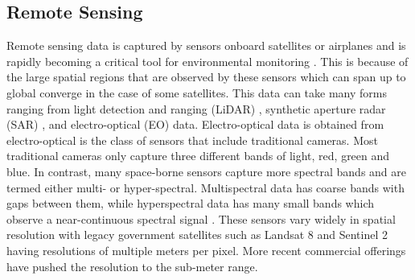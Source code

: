 \subsection{Remote Sensing}
Remote sensing data is captured by sensors onboard satellites or airplanes and is rapidly becoming a critical tool for environmental monitoring \cite{Parra2022RemoteMonitoring}. This is because of the large spatial regions that are observed by these sensors which can span up to global converge in the case of some satellites. This data can take many forms ranging from light detection and ranging (LiDAR) \cite{LiDARForestryBeland2019}, synthetic aperture radar (SAR) \cite{Hall2020WhatEarthdata}, and electro-optical (EO) data. Electro-optical data is obtained from electro-optical is the class of sensors that include traditional cameras. Most traditional cameras only capture three different bands of light, red, green and blue. In contrast, many space-borne sensors capture more spectral bands and are termed either multi- or hyper-spectral. Multispectral data has coarse bands with gaps between them, while hyperspectral data has many small bands which observe a near-continuous spectral signal \cite{Lu2019ComparingProperties}. These sensors vary widely in spatial resolution with legacy government satellites such as Landsat 8 and Sentinel 2 having resolutions of multiple meters per pixel. More recent commercial offerings have pushed the resolution to the sub-meter range. 



